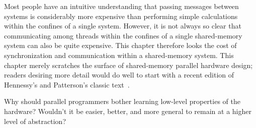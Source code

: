 

Most people have an intuitive understanding that passing messages between
systems is considerably more expensive than performing simple calculations
within the confines of a single system.
However, it is not always so clear that communicating among threads within
the confines of a single shared-memory system can also be quite expensive.
This chapter therefore looks the cost of synchronization and communication
within a shared-memory system.
This chapter merely scratches the surface of shared-memory parallel
hardware design; readers desiring more detail would do well to start
with a recent edition of
Hennessy's and Patterson's classic text~\cite{Hennessy95a}.

\QuickQuiz{}
	Why should parallel programmers bother learning low-level
	properties of the hardware?
	Wouldn't it be easier, better, and more general to remain at
	a higher level of abstraction?
 \QuickQuizEnd





